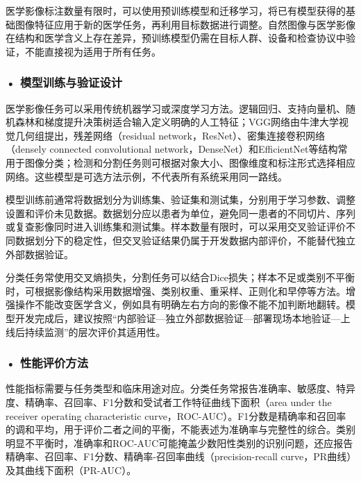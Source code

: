 医学影像标注数量有限时，可以使用预训练模型和迁移学习，将已有模型获得的基础图像特征应用于新的医学任务，再利用目标数据进行调整。自然图像与医学影像在结构和医学含义上存在差异，预训练模型仍需在目标人群、设备和检查协议中验证，不能直接视为适用于所有任务。

\subsubsection*{\textbf{• 模型训练与验证设计}}

医学影像任务可以采用传统机器学习或深度学习方法。逻辑回归、支持向量机、随机森林和梯度提升决策树适合输入定义明确的人工特征；VGG网络由牛津大学视觉几何组提出，残差网络（residual network，ResNet）、密集连接卷积网络（densely connected convolutional network，DenseNet）和EfficientNet等结构常用于图像分类；检测和分割任务则可根据对象大小、图像维度和标注形式选择相应网络。这些模型是可选方法示例，不代表所有系统采用同一路线。

模型训练前通常将数据划分为训练集、验证集和测试集，分别用于学习参数、调整设置和评价未见数据。数据划分应以患者为单位，避免同一患者的不同切片、序列或复查影像同时进入训练集和测试集。样本数量有限时，可以采用交叉验证评价不同数据划分下的稳定性，但交叉验证结果仍属于开发数据内部评价，不能替代独立外部数据验证。

分类任务常使用交叉熵损失，分割任务可以结合Dice损失；样本不足或类别不平衡时，可根据影像结构采用数据增强、类别权重、重采样、正则化和早停等方法。增强操作不能改变医学含义，例如具有明确左右方向的影像不能不加判断地翻转。模型开发完成后，建议按照“内部验证—独立外部数据验证—部署现场本地验证—上线后持续监测”的层次评价其适用性\label{note:ch9-tripod}。

\subsubsection*{\textbf{• 性能评价方法}}

性能指标需要与任务类型和临床用途对应。分类任务常报告准确率、敏感度、特异度、精确率、召回率、F1分数和受试者工作特征曲线下面积（area under the receiver operating characteristic curve，ROC-AUC）。F1分数是精确率和召回率的调和平均，用于评价二者之间的平衡，不能表述为准确率与完整性的综合。类别明显不平衡时，准确率和ROC-AUC可能掩盖少数阳性类别的识别问题，还应报告精确率、召回率、F1分数、精确率-召回率曲线（precision-recall curve，PR曲线）及其曲线下面积（PR-AUC）\label{note:ch9-prcurve}。

